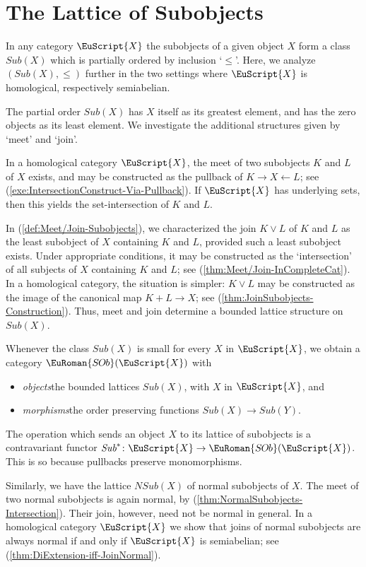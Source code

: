 \documentclass [12pt,oneside]{book}%
\theoremstyle{captionstyle}  %
\newenvironment{ulist}{			%
	\begin{itemize}}{
	\end{itemize}
}
\newcommand{\from}{\colon}				%
\newcommand{\Ctgry}[1]{\EuScript{#1}}					%
\newcommand{\SACtgry}[1]{\EuScript{#1}}			%
\newcommand{\SubObjcts}[1]{\mathit{Sub}(#1)}	%
\newcommand{\NSubObjcts}[1]{\mathit{NSub}(#1)}	%
\newcommand{\SubObjctCat}[1]{\EuRoman{S{\kern-0.12ex}O{\kern-0.12ex}b}({\EuScript{#1}})}	%
\newcommand{\SubObjctsPullFunc}{\textit{Sub}^{\ast}}									%
\newcommand{\join}{\ensuremath{\vee}}
\begin{document}
\section[The Lattice of Subobjects]{The Lattice of Subobjects}%
\label{sec:LatticeOfSubjects}

In any category $\SACtgry{X}$ the subobjects of a given object $X$ form a class $\SubObjcts{X}$ which is partially ordered by inclusion `$\leq$'. Here, we analyze $(\SubObjcts{X},\leq)$ further in the two settings where $\Ctgry{X}$ is homological, respectively semiabelian.

The partial order $\SubObjcts{X}$ has $X$ itself as its greatest element, and has the zero objects as its least element. We  investigate the additional structures given by `meet' and `join'.

In a homological category $\Ctgry{X}$, the meet of two subobjects $K$ and $L$ of $X$ exists, and may be constructed as the pullback of $K\to X\leftarrow L$; see (\ref{exe:IntersectionConstruct-Via-Pullback}). If $\Ctgry{X}$ has underlying sets, then this yields the set-intersection of $K$ and $L$.

In (\ref{def:Meet/Join-Subobjects}), we characterized the join $K\join L$ of $K$ and $L$ as the least subobject of $X$ containing $K$ and $L$, provided such a least subobject exists. Under appropriate conditions, it may be constructed as the `intersection' of all subjects of $X$ containing $K$ and $L$; see (\ref{thm:Meet/Join-InCompleteCat}).  In a homological category, the situation is simpler: $K\join L$ may be constructed as the image of the canonical map $K+L\to X$; see (\ref{thm:JoinSubobjects-Construction}). Thus, meet and join determine a bounded lattice structure on $\SubObjcts{X}$.

Whenever the class $\SubObjcts{X}$ is small for every $X$ in $\Ctgry{X}$, we obtain a category $\SubObjctCat{X}$ with
\begin{ulist}
    \item \emph{objects}\quad the bounded lattices $\SubObjcts{X}$, with $X$ in $\Ctgry{X}$, and
    \item \emph{morphisms}\quad the order preserving functions $\SubObjcts{X}\to \SubObjcts{Y}$.
\end{ulist}
The operation which sends an object $X$ to its lattice of subobjects is a contravariant functor $\SubObjctsPullFunc\from \Ctgry{X}\to \SubObjctCat{X}$. This is so because pullbacks preserve monomorphisms.

Similarly, we have the lattice $\NSubObjcts{X}$ of normal subobjects of $X$. The meet of two normal subobjects is again normal, by (\ref{thm:NormalSubobjects-Intersection}). Their join, however, need not be normal in general. In a homological category $\Ctgry{X}$ we show that joins of normal subobjects are always normal if and only if $\Ctgry{X}$ is semiabelian; see (\ref{thm:DiExtension-iff-JoinNormal}).
\end{document}
